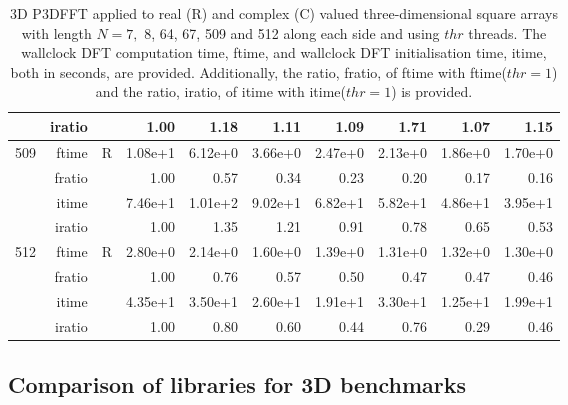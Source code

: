 \documentclass[a4paper]{article}
\begin{document}
\begin{table}
\begin{center}
\begin{tabular}{|r|r|r|r|r|r|r|r|r|r|}
     & iratio & &      1.00 &   1.18 &   1.11 &   1.09 &   1.71 &   1.07 &   1.15      \\ \hline 
  509  & ftime & R  &  1.08e+1 &   6.12e+0 &   3.66e+0 &   2.47e+0 &   2.13e+0 &   1.86e+0 &   1.70e+0    \\ 
      & fratio & &     1.00 &   0.57 &   0.34 &   0.23 &   0.20 &   0.17 &   0.16        \\ 
     & itime & &       7.46e+1 &   1.01e+2 &  9.02e+1  &   6.82e+1 &   5.82e+1 &   4.86e+1 &   3.95e+1       \\ 
     & iratio & &      1.00 &   1.35 &   1.21 &   0.91 &   0.78 &   0.65 &   0.53         \\ \hline 
  512  & ftime & R  &  2.80e+0 &   2.14e+0 &   1.60e+0 &   1.39e+0 &   1.31e+0 &   1.32e+0 &   1.30e+0     \\ 
      & fratio & &     1.00 &   0.76 &   0.57 &   0.50 &   0.47 &   0.47 &   0.46     \\ 
     & itime & &       4.35e+1 &   3.50e+1 &   2.60e+1 &   1.91e+1 &   3.30e+1 &   1.25e+1 &   1.99e+1        \\ 
     & iratio & &      1.00 &   0.80 &   0.60 &   0.44 &   0.76 &   0.29 &   0.46        \\ \hline
\end{tabular}
\caption{3D P3DFFT applied to real (R) and complex (C) valued three-dimensional square arrays with length
  $N=7,$ 8, 64, 67, 509 and 512 along each side and using $thr$ threads. The wallclock DFT computation time,
  ftime, and wallclock DFT initialisation time, itime, both in seconds, are provided. Additionally,  the ratio,
  fratio, of ftime  with ftime($thr=1$) and the ratio, iratio, of itime  with itime($thr=1$) is provided. }\label{Tbl:P3DFFT3d}
\end{center}
\end{table}





\subsection{Comparison of libraries for 3D benchmarks}\label{Sec:3DComp}
\end{document}
